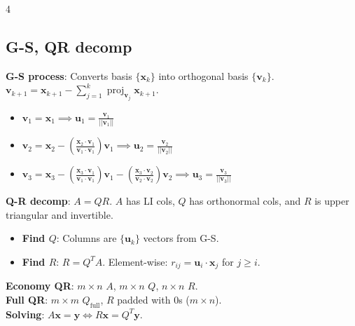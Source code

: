 \documentclass[9pt]{extarticle}
\begin{document}
\begin{multicols*}{4}
{{    \subsection*{G-S, QR decomp}
    \textbf{G-S process}: Converts basis $\{\mathbf{x}_{k}\}$ into orthogonal basis $\{\mathbf{v}_{k}\}$.\\
    $\mathbf{v}_{k+1}=\mathbf{x}_{k+1}-\sum_{j=1}^{k}\operatorname{proj}_{\mathbf{v}_{j}}\mathbf{x}_{k+1}$.
    \begin{itemize}
        \item $\mathbf{v}_{1}=\mathbf{x}_{1} \implies \mathbf{u}_{1}=\frac{\mathbf{v}_{1}}{||\mathbf{v}_{1}||}$
        \item $\mathbf{v}_{2}=\mathbf{x}_{2}-(\frac{\mathbf{x}_{2}\cdot \mathbf{v}_{1}}{\mathbf{v}_{1}\cdot \mathbf{v}_{1}})\mathbf{v}_{1} \implies \mathbf{u}_{2}=\frac{\mathbf{v}_{2}}{||\mathbf{v}_{2}||}$
        \item $\mathbf{v}_{3}=\mathbf{x}_{3}-(\frac{\mathbf{x}_{3}\cdot \mathbf{v}_{1}}{\mathbf{v}_{1}\cdot \mathbf{v}_{1}})\mathbf{v}_{1}-(\frac{\mathbf{x}_{3}\cdot \mathbf{v}_{2}}{\mathbf{v}_{2}\cdot \mathbf{v}_{2}})\mathbf{v}_{2} \implies \mathbf{u}_{3}=\frac{\mathbf{v}_{3}}{||\mathbf{v}_{3}||}$
    \end{itemize}
    \textbf{Q-R decomp}: $A=QR$. $A$ has LI cols, $Q$ has orthonormal cols, and $R$ is upper triangular and invertible.
    \begin{itemize}
        \item \textbf{Find $Q$}: Columns are $\{\mathbf{u}_{k}\}$ vectors from G-S.
        \item \textbf{Find $R$}: $R=Q^{T}A$. Element-wise: $r_{ij} = \mathbf{u}_{i} \cdot \mathbf{x}_{j}$ for $j \ge i$.
    \end{itemize}
    \textbf{Economy QR}: $m\times n$ $A$, $m\times n$ $Q$, $n\times n$ $R$.\\
    \textbf{Full QR}: $m \times m$ $Q_{\text{full}}$, $R$ padded with $0$s ($m \times n$).\\
    \textbf{Solving}: $A\mathbf{x}=\mathbf{y} \Leftrightarrow R\mathbf{x}=Q^{T}\mathbf{y}$.
    \vspace{1pt}
  }%
}


\end{multicols*}
\end{document}
